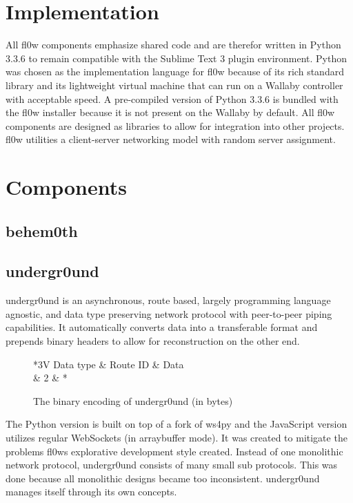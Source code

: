 \documentclass[conference]{IEEEtran}
\begin{document}
\section{Implementation}
All fl0w components emphasize shared code and are therefor written in Python 3.3.6\cite{Python 3.3.6:Python Foundation} to remain compatible with the Sublime Text 3\cite{Sublime Text 3:Sublime HQ} plugin environment. Python was chosen as the implementation language for fl0w because of its rich standard library and its lightweight virtual machine that can run on a Wallaby controller with acceptable speed. A pre-compiled version of Python 3.3.6 \cite{Python 3.3.6:Python Foundation} is bundled with the fl0w installer because it is not present on the Wallaby by default. All fl0w components are designed as libraries to allow for integration into other projects. fl0w utilities a client-server networking model with random server assignment.

\section{Components}
\subsection{behem0th}

\subsection{undergr0und}
undergr0und\cite{undergr0und:Philip Trauner} is an asynchronous, route based, largely programming language agnostic, and data type preserving network protocol with peer-to-peer piping capabilities. 
It automatically converts data into a transferable format and prepends binary headers to allow for reconstruction on the other end. 

\begin{figure}[H]
\centering
	\begin{tabular}{*{3}{V}}
		Data type & Route ID & Data \\  & 2 & * \\
	\end{tabular}
	\caption{The binary encoding of undergr0und (in bytes)}
\label{fig:undergr0und_header}
\end{figure}


The Python\cite{Python 3.3.6:Python Foundation} version is built on top of a fork of ws4py\cite{ws4py:Philip Trauner} and the JavaScript version utilizes regular WebSockets\cite{The WebSocket Protocol:A. Melnikov} (in arraybuffer mode). It was created to mitigate the problems fl0ws explorative development style created. Instead of one monolithic network protocol, undergr0und consists of many small sub protocols. This was done because all monolithic designs became too inconsistent. undergr0und\cite{undergr0und:Philip Trauner} manages itself through its own concepts. 
\end{document}
